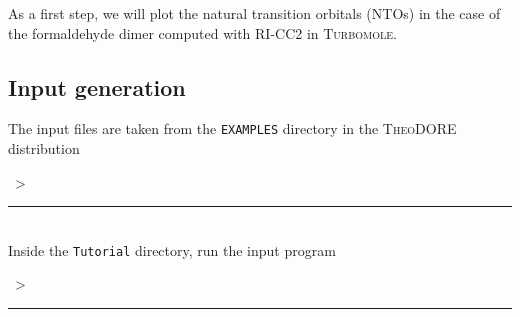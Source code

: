 \documentclass[DIV=12,headings=normal]{scrartcl}
\newcommand\Cline[2][red]{{\sbox\MBox{#2}%
  \rlap{\usebox\MBox}\color{#1}\rule[-1.2\dp\MBox]{\wd\MBox}{0.5pt}}}
\newcommand{\redl}[1]{\Cline{\textcolor{red}{#1}}}
\newcommand{\comm}[1]{
\small
~> \redl{#1}
\normalsize
}
\newcommand{\theo}{\textsc{TheoDORE}}
\begin{document}
As a first step, we will plot the natural transition orbitals (NTOs) in the case of the formaldehyde dimer computed with RI-CC2 in \textsc{Turbomole}.

\subsection{Input generation}
\label{sec:inpnto}

The input files are taken from the \texttt{EXAMPLES} directory in the \theo{} distribution

\comm{cp -r \$THEODIR/EXAMPLES/fa2.ricc2/QC\_FILES/ Tutorial} \\

Inside the \texttt{Tutorial} directory, run the input program

\comm{theoinp}
\end{document}
